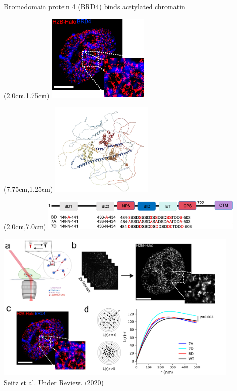 \documentclass{beamer}					%
\begin{document}
\begin{frame}{Bromodomain protein 4 (BRD4) binds acetylated chromatin}

\begin{textblock*}{5cm}(2.0cm,1.75cm)
\includegraphics[width=5cm]{media/TwoColor}
\end{textblock*}

\begin{textblock*}{5cm}(7.75cm,1.25cm)
\includegraphics[width=5cm]{media/BRD4-Structure}
\end{textblock*}

\begin{textblock*}{10cm}(2.0cm,7.0cm)
\includegraphics[width=10cm]{media/Mutations}
\end{textblock*}

\end{frame}


\begin{frame}
\includegraphics[width=12cm]{media/BRD4-STORM}
\\
Seitz et al. Under Review. (2020)
\end{frame}
\end{document}
